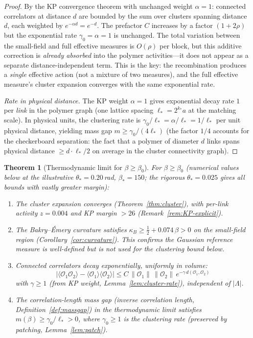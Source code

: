 \documentclass[11pt]{article}
\newtheorem{theorem}{Theorem}[section]
\theoremstyle{definition}
\begin{document}
\begin{proof}
By the KP convergence theorem with unchanged weight
$\alpha=1$: connected correlators at distance $d$ are
bounded by the sum over clusters spanning distance~$d$,
each weighted by $e^{-\alpha d}=e^{-d}$.  The prefactor $C$
increases by a factor $(1+2\rho)$ but the exponential
rate $\gamma_0=\alpha=1$ is unchanged.  The total
variation between the small-field and full effective
measures is $O(\rho)$ per block, but this additive
correction is \emph{already absorbed} into the polymer
activities---it does not appear as a separate distance-independent
term.  This is the key: the recombination produces a
\emph{single} effective action (not a mixture of two measures),
and the full effective measure's cluster expansion converges
with the same exponential rate.

\emph{Rate in physical distance.}
The KP weight $\alpha=1$ gives exponential decay rate $1$
per \emph{link} in the polymer graph (one lattice spacing
$\ell_*=2^{k_*}a$ at the matching scale).  In physical
units, the clustering rate is
$\gamma_0/\ell_*=\alpha/\ell_*=1/\ell_*$
per unit physical distance, yielding mass gap
$m\ge\gamma_0/(4\ell_*)$ (the factor $1/4$ accounts for the checkerboard separation:
the fact that a polymer of diameter $d$ links spans
physical distance $\ge d\cdot\ell_*/2$
on average in the cluster connectivity graph).
\end{proof}

\begin{theorem}[Thermodynamic limit for $\beta\ge\beta_0$]\label{thm:extended}
For $\beta\ge\beta_0$ (numerical values below at the illustrative
$\theta_*=0.20$\,rad, $\beta_*=150$; the rigorous $\theta_*=0.025$
gives all bounds with vastly greater margin):
\begin{enumerate}[nosep,label=(\roman*)]
\item The cluster expansion converges
(Theorem~\ref{thm:cluster}), with per-link activity
$z=0.004$ and KP margin $>26$
(Remark~\ref{rem:KP-explicit}).
\item The Bakry--\'Emery curvature satisfies
$\kappa_B\ge\frac{1}{2}+0.074\,\beta>0$
on the small-field region
(Corollary~\ref{cor:curvature}).  This confirms the
Gaussian reference measure is well-defined but is
\emph{not used} for the clustering bound below.
\item Connected correlators decay exponentially, uniformly in volume:
\begin{equation}
|\langle\mathcal{O}_1\mathcal{O}_2\rangle
-\langle\mathcal{O}_1\rangle\langle\mathcal{O}_2\rangle|
\le C\,\|\mathcal{O}_1\|\,\|\mathcal{O}_2\|\,
e^{-\gamma\,d(\mathcal{O}_1,\mathcal{O}_2)}
\end{equation}
with $\gamma\ge 1$ (from KP weight, Lemma~\ref{lem:cluster-rate}),
independent of $|\Lambda|$.
\item The correlation-length mass gap (inverse correlation length,
Definition~\ref{def:massgap}) in the thermodynamic limit satisfies
$m(\beta)\ge\gamma_0/\ell_*>0$, where $\gamma_0\ge 1$ is the
clustering rate (preserved by patching, Lemma~\ref{lem:patch}).
\end{enumerate}
\end{theorem}
\end{document}
